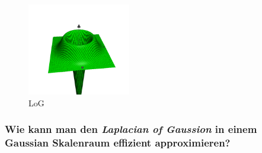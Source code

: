 \begin{figure}[p] %
   \centering
   \includegraphics[width=0.4\textwidth]{Uebung6/LoG.pdf} 
   \caption{LoG}
   \label{fig:LoG}
\end{figure}

\subsubsection*{Wie kann man den \emph{Laplacian of Gaussion} in einem Gaussian Skalenraum effizient approximieren?}
